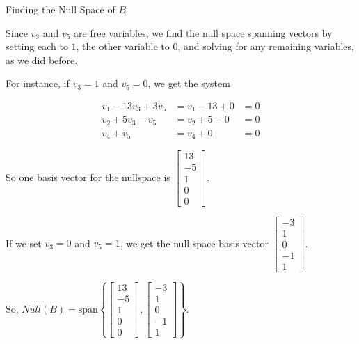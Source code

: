 \documentclass{ximera}
\begin{document}
\begin{problem}{Finding the Null Space of $B$}
\begin{solution}
    Since $v_3$ and $v_5$ are free variables, we find the null space spanning vectors by setting each to $1$, the other variable to $0$, and solving for any remaining variables, as we did before.

    For instance, if $v_3=1$ and $v_5=0$, we get the system

    \[
    \begin{aligned}
        v_1 - 13v_3 + 3v_5 &= v_1 - 13 + 0 &= 0 \\
        v_2 + 5v_3 - v_5 &= v_2 + 5 - 0 &= 0 \\
        v_4 + v_5 &= v_4 + 0 &= 0
    \end{aligned}
    \]

    So one basis vector for the nullspace is $\begin{bmatrix} 13 \\ -5 \\ 1 \\ 0 \\ 0 \end{bmatrix}$.

    If we set $v_3=0$ and $v_5=1$, we get the null space basis vector $\begin{bmatrix} -3 \\ 1 \\ 0 \\ -1 \\ 1 \end{bmatrix}$.

    So, $Null(B)=\text{span}\left\{ \begin{bmatrix} 13 \\ -5 \\ 1 \\ 0 \\ 0 \end{bmatrix}, \begin{bmatrix} -3 \\ 1 \\ 0 \\ -1 \\ 1 \end{bmatrix} \right\}$.

    \end{solution}

\end{problem}
\end{document}
